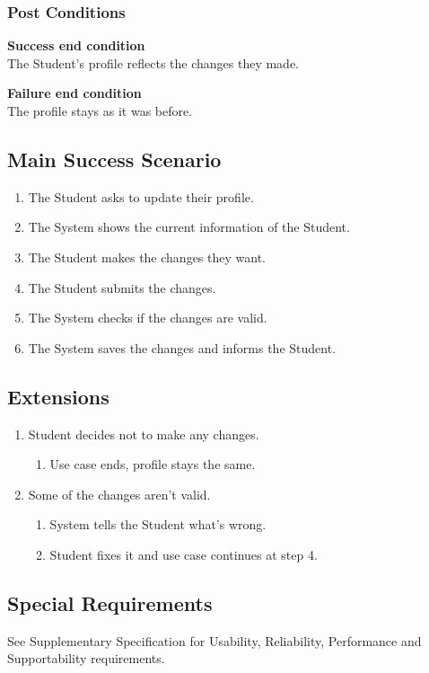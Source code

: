 \documentclass[10pt,letterpaper]{article}
\begin{document}
\subsubsection*{Post Conditions}

\textbf{Success end condition}\\
The Student's profile reflects the changes they made.

\textbf{Failure end condition}\\
The profile stays as it was before.

\subsection*{Main Success Scenario}
\begin{enumerate}
    \item The Student asks to update their profile.
    \item The System shows the current information of the Student.
    \item The Student makes the changes they want.
    \item The Student submits the changes.
    \item The System checks if the changes are valid.
    \item The System saves the changes and informs the Student.
\end{enumerate}

\subsection*{Extensions}
\begin{enumerate}
    \item[3a.] Student decides not to make any changes.
    \begin{enumerate}
        \item[1.] Use case ends, profile stays the same.
    \end{enumerate}
    \item[5a.] Some of the changes aren't valid.
    \begin{enumerate}
        \item[1.] System tells the Student what's wrong.
        \item[2.] Student fixes it and use case continues at step 4.
    \end{enumerate}
\end{enumerate}

\subsection*{Special Requirements}
See Supplementary Specification for Usability, Reliability, Performance and Supportability requirements.
\end{document}
